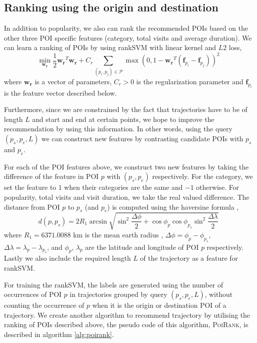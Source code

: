 \subsection{Ranking using the origin and destination}
\label{sec:ranksvm}


In addition to popularity, we also can rank the recommended POIs based on the other three POI specific features (category, total visits and average duration).
We can learn a ranking of POIs by using rankSVM with linear kernel and $L2$ loss\cite{lranksvm},
\begin{displaymath}
\min_{\mathbf{w_r}} \frac{1}{2} \mathbf{w_r}^T \mathbf{w_r} +
                    C_r \sum_{(p_i, p_j) \in \mathcal{P}}
                    \max \left( 0, 1 - \mathbf{w_r}^T (\mathbf{f}_{p_i} - \mathbf{f}_{p_j}) \right)^2
\end{displaymath}
where $\mathbf{w_r}$ is a vector of parameters,
$C_r > 0$ is the regularization parameter and
$\mathbf{f}_{p_i}$ is the feature vector described below.

Furthermore, since we are constrained by the fact that trajectories have to be of length $L$ and start and end at certain points, we hope to improve the recommendation by using this information.
In other words, using the query $(p_s, p_e, L)$ we can construct new features by contrasting
candidate POIs with $p_s$ and $p_e$.

For each of the POI features above, we construct two new features by taking the difference of
the feature in POI $p$ with $(p_s, p_e)$ respectively.
For the category, we set the feature to $1$ when their categories are the same and $-1$ otherwise.
For popularity, total visits and visit duration, we take the real valued difference.
The distance from POI $p$ to $p_s$ (and $p_e$) is computed using the haversine formula \cite{haversine},
\begin{displaymath}
  d(p, p_s) = 2 R_1 \arcsin \sqrt{ \sin^2 \frac{\Delta \phi}{2} +
    \cos \phi_p \cos \phi_{p_s} \sin^2 \frac{\Delta \lambda}{2} }
\end{displaymath}
where $R_1 = 6371.0088$ km is the mean earth radius \cite{earth_radius},
$\Delta \phi = \phi_p - \phi_{p_s}$, $\Delta \lambda = \lambda_p - \lambda_{p_s}$,
and $\phi_p$, $\lambda_p$ are the latitude and longitude of POI $p$ respectively.
Lastly we also include the required length $L$ of the trajectory as a feature for rankSVM.

For training the rankSVM, the labels are generated using the number of occurrences of
POI $p$ in trajectories grouped by query $(p_s, p_e, L)$,
without counting the occurrence of $p$ when it is the origin or destination POI of a trajectory.
We create another algorithm to recommend trajectory by utilising
the ranking of POIs described above,
the pseudo code of this algorithm, \textsc{PoiRank}, is described in algorithm \ref{alg:poirank}.

